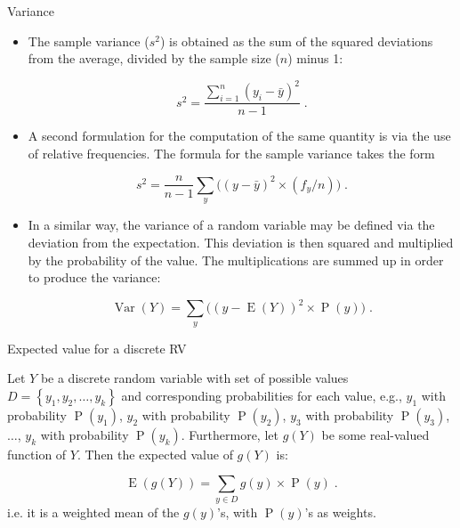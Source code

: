 \documentclass[10pt,handout]{beamer}\usepackage[]{graphicx}\usepackage[]{color}
\newcommand{\Var}{\operatorname{Var}}
\newcommand{\Expec}{\operatorname{E}}
\newcommand{\Prob}{\operatorname{P}}
\begin{document}
\begin{frame}[fragile]{Variance}
	\small
	\begin{itemize}		
		
		\item The sample variance ($s^2$) is obtained as the sum of the squared
		deviations from the average, divided by the sample size ($n$) minus 1:
		
		$$s^2 = \frac{\sum_{i=1}^n (y_i - \bar y)^2}{n-1}\;.$$ 
		
		\item  A second	formulation for the computation of the same quantity is via the use of
		relative frequencies. The formula for the sample variance takes the form
		
		$$s^2 = \frac{n}{n-1}\sum_y \big((y - \bar y)^2\times (f_y/n)\big)\;.$$
		
		
		\item In a similar way, the variance of a random variable may be defined via
		the deviation from the expectation. This deviation is
		then squared and multiplied by the probability of the value. The
		multiplications are summed up in order to produce the variance:
		
		$$\Var(Y) = \sum_y\big( (y-\Expec(Y))^2 \times \Prob(y)\big)\;.$$
		
	\end{itemize}
	
\end{frame}


\begin{frame}{Expected value for a discrete RV}
	
	\begin{definition}
		Let $Y$ be a discrete random variable with set of possible values $D=\left\lbrace y_1, y_2, \ldots,y_k  \right\rbrace$ and corresponding probabilities for each value, e.g., $y_1$ with probability $\Prob(y_1)$, $y_2$ with probability $\Prob(y_2)$, $y_3$ with probability $\Prob(y_3)$, $\ldots$, $y_k$ with probability $\Prob(y_k)$. Furthermore, let $g(Y)$ be some real-valued function of $Y$. Then the expected value of $g(Y)$ is:
		
		$$\operatorname{E}(g(Y)) =  \sum_{y \in D} g(y) \times \operatorname{P}(y)\;.$$
		i.e. it is a weighted mean of the $g(y)$'s, with $\Prob(y)$'s as weights.
	\end{definition}
	
\end{frame}
\end{document}
